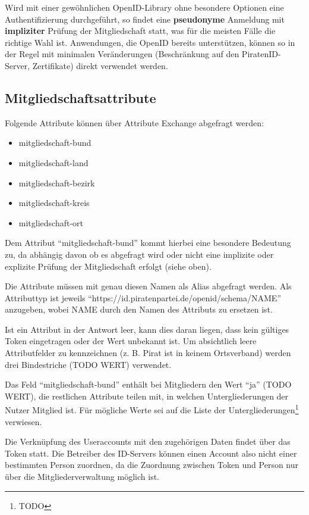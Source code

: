 \documentclass[parskip=half]{scrartcl}
\begin{document}
Wird mit einer gewöhnlichen OpenID-Library ohne besondere Optionen eine Authentifizierung durchgeführt, 
so findet eine \textbf{pseudonyme} Anmeldung mit \textbf{impliziter} Prüfung der Mitgliedschaft statt, was für die meisten Fälle die richtige Wahl ist.
Anwendungen, die OpenID bereits unterstützen, können so in der Regel mit minimalen Veränderungen (Beschränkung auf den PiratenID-Server, Zertifikate) direkt verwendet werden.

\subsection{Mitgliedschaftsattribute}
Folgende Attribute können über Attribute Exchange abgefragt werden:
\label{sec:attribute}
\begin{itemize}
\item mitgliedschaft-bund
\item mitgliedschaft-land
\item mitgliedschaft-bezirk
\item mitgliedschaft-kreis
\item mitgliedschaft-ort
\end{itemize}

Dem Attribut "`mitgliedschaft-bund"' kommt hierbei eine besondere Bedeutung zu,
da abhängig davon ob es abgefragt wird oder nicht eine implizite oder explizite Prüfung der Mitgliedschaft erfolgt (siehe oben).

Die Attribute müssen mit genau diesen Namen als Alias abgefragt werden.
Als Attributtyp ist jeweils "`https://id.piratenpartei.de/openid/schema/NAME"' anzugeben, wobei NAME durch den Namen des Attributs zu ersetzen ist.

Ist ein Attribut in der Antwort leer, kann dies daran liegen, dass kein gültiges Token eingetragen oder der Wert unbekannt ist.
Um absichtlich leere Attributfelder zu kennzeichnen (z. B. Pirat ist in keinem Ortsverband) werden drei Bindestriche (TODO WERT) verwendet.

Das Feld "`mitgliedschaft-bund"' enthält bei Mitgliedern den Wert "`ja"' (TODO WERT),
die restlichen Attribute teilen mit, in welchen Untergliederungen der Nutzer Mitglied ist.
Für mögliche Werte sei auf die Liste der Untergliederungen\footnote{TODO} verwiesen.

Die Verknüpfung des Useraccounts mit den zugehörigen Daten findet über das Token statt.
Die Betreiber des ID-Servers können einen Account also nicht einer bestimmten Person zuordnen,
da die Zuordnung zwischen Token und Person nur über die Mitgliederverwaltung möglich ist.
\end{document}

